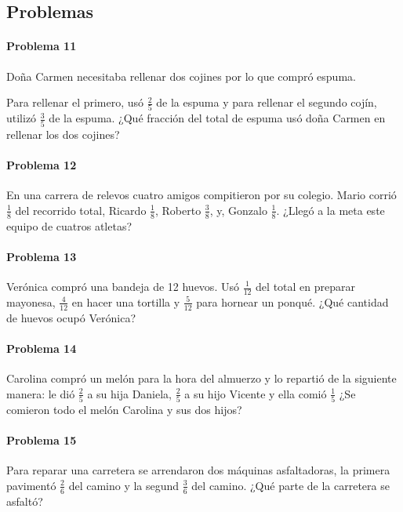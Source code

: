 \documentclass[10pt,twoside]{article}
\begin{document}
\subsection*{Problemas}
\paragraph*{Problema 11}
Doña Carmen necesitaba rellenar dos cojines por lo que compró espuma.

Para rellenar el primero, usó $\frac{2}{5}$ de la espuma y para rellenar el segundo cojín, utilizó $\frac{3}{5}$ de la espuma. ¿Qué fracción del total de espuma usó doña Carmen en rellenar los dos cojines?
\paragraph*{Problema 12}
En una carrera de relevos cuatro amigos compitieron por su colegio. Mario corrió $\frac{1}{8}$ del recorrido total, Ricardo $\frac{1}{8}$, Roberto $\frac{3}{8}$, y, Gonzalo $\frac{1}{8}$. ¿Llegó a la meta este equipo de cuatros atletas?
\paragraph*{Problema 13}
Verónica compró una bandeja de 12 huevos. Usó $\frac{1}{12}$ del total en preparar mayonesa, $\frac{4}{12}$ en hacer una tortilla y $\frac{5}{12}$ para hornear un ponqué. ¿Qué cantidad de huevos ocupó Verónica?
\paragraph*{Problema 14}
Carolina compró un melón para la hora del almuerzo y lo repartió de la siguiente manera: le dió $\frac{2}{5}$ a su hija Daniela, $\frac{2}{5}$ a su hijo Vicente y ella comió $\frac{1}{5}$ ¿Se comieron todo el melón Carolina y sus dos hijos?
\paragraph*{Problema 15}
Para reparar una carretera se arrendaron dos máquinas asfaltadoras, la primera pavimentó $\frac{2}{6}$ del camino y la segund $\frac{3}{6}$ del camino. ¿Qué parte de la carretera se asfaltó?
\end{document}
